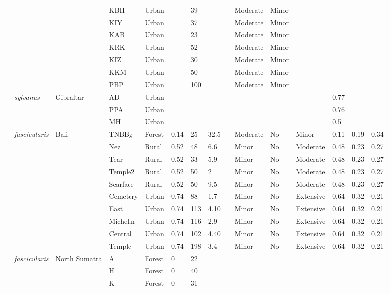 \documentclass{../../../coursework}
\begin{document}
\begin{landscape}
\begin{longtabu}{X[L,2]X[1.1]XX[1.25]XXXXXXXX[0.75]X[0.5]XX}
            &  &  & KBH & Urban &  & 39 &  &  & Moderate & Minor &  &  &  &  \\
            &  &  & KIY & Urban &  & 37 &  &  & Moderate & Minor &  &  &  &  \\
            &  &  & KAB & Urban &  & 23 &  &  & Moderate & Minor &  &  &  &  \\
            &  &  & KRK & Urban &  & 52 &  &  & Moderate & Minor &  &  &  &  \\
            &  &  & KIZ & Urban &  & 30 &  &  & Moderate & Minor &  &  &  &  \\
            &  &  & KKM & Urban &  & 50 &  &  & Moderate & Minor &  &  &  &  \\
            &  &  & PBP & Urban &  & 100 &  &  & Moderate & Minor &  &  &  &  \\
         \textcite{Sch121} & \textit{sylvanus} & Gibraltar & AD & Urban &  &  &  &  &  &  &  & 0.77 &  &  \\
            &  &  & PPA & Urban &  &  &  &  &  &  &  & 0.76 &  &  \\
            &  &  & MH & Urban &  &  &  &  &  &  &  & 0.5 &  &  \\
         \textcite{Beh14} & \textit{fascicularis} & Bali & TNBBg & Forest & 0.14 & 25 & 32.5 &  & Moderate & No & Minor & 0.11 & 0.19 & 0.34 \\
            &  &  & Nez & Rural & 0.52 & 48 & 6.6 &  & Minor & No & Moderate & 0.48 & 0.23 & 0.27 \\
            &  &  & Tear & Rural & 0.52 & 33 & 5.9 &  & Minor & No & Moderate & 0.48 & 0.23 & 0.27 \\
            &  &  & Temple2 & Rural & 0.52 & 50 & 2 &  & Minor & No & Moderate & 0.48 & 0.23 & 0.27 \\
            &  &  & Scarface & Rural & 0.52 & 50 & 9.5 &  & Minor & No & Moderate & 0.48 & 0.23 & 0.27 \\
            &  &  & Cemetery & Urban & 0.74 & 88 & 1.7 &  & Minor & No & Extensive & 0.64 & 0.32 & 0.21 \\
            &  &  & East & Urban & 0.74 & 113 & 4.10 &  & Minor & No & Extensive & 0.64 & 0.32 & 0.21 \\
            &  &  & Michelin & Urban & 0.74 & 116 & 2.9 &  & Minor & No & Extensive & 0.64 & 0.32 & 0.21 \\
            &  &  & Central & Urban & 0.74 & 102 & 4.40 &  & Minor & No & Extensive & 0.64 & 0.32 & 0.21 \\
            &  &  & Temple & Urban & 0.74 & 198 & 3.4 &  & Minor & No & Extensive & 0.64 & 0.32 & 0.21 \\
         \textcite{van99} & \textit{fascicularis} & North Sumatra & A & Forest & 0 & 22 &  &  &  &  &  &  &  &  \\
            &  &  & H & Forest & 0 & 40 &  &  &  &  &  &  &  &  \\
            &  &  & K & Forest & 0 & 31 &  &  &  &  &  &  &  &  \\
        \bottomrule
    \end{longtabu}
\end{landscape}
\end{document}

